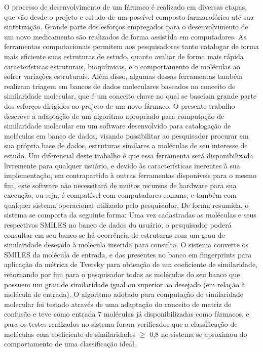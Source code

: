 \begin{resumo}
O processo de desenvolvimento de um fármaco é realizado em diversas etapas, que vão desde
o projeto e estudo de um possível composto farmacofórico até sua sintetização. Grande parte
dos esforços empregados para o desenvolvimento de um novo medicamento são realizados de
forma assistida em computadores. As ferramentas computacionais permitem aos pesquisadores
tanto catalogar de forma mais eficiente suas estruturas de estudo, quanto avaliar de forma mais rápida características estruturais, bioquímicas, e o comportamento de moléculas ao sofrer variações estruturais. Além disso, algumas dessas ferramentas também realizam triagem em bancos de dados moleculares baseados no conceito de similaridade molecular, que é um conceito chave no qual se baseiam grande parte dos esforços dirigidos ao projeto de um novo fármaco. O presente trabalho descreve a adaptação de um algoritmo apropriado para
computação de similaridade molecular em um software desenvolvido para catalogação de
moléculas em banco de dados, visando possibilitar ao pesquisador procurar em sua própria
base de dados, estruturas similares a moléculas de seu interesse de estudo. Um diferencial deste trabalho é que essa ferramenta será disponibilizada livremente para qualquer usuário, e devido às características inerentes à sua implementação, em contrapartida à outras ferramentas
disponíveis para o mesmo fim, este software não necessitará de muitos recursos de hardware
para sua execução, ou seja, é compatível com computadores comuns, e também com qualquer
sistema operacional utilizado pelo pesquisador. De forma resumida, o sistema se comporta da
seguinte forma: Uma vez cadastradas as moléculas e seus respectivos SMILES no banco de dados do usuário, o
pesquisador poderá consultar em seu banco se há ocorrência de estruturas com um grau de
similaridade desejado à molécula inserida para consulta. O sistema converte os SMILES da molécula de
entrada, e das presentes no banco em fingerprints para aplicação da métrica de Tversky para
obtenção de um coeficiente de similaridade, retornando por fim para o pesquisador todas as
moléculas do seu banco que possuem um grau de similaridade igual ou superior ao desejado
(em relação à molécula de entrada). O algoritmo adotado para computação de similaridade molecular foi testado através de uma adaptação do conceito de matriz de confusão e teve como entrada 7 moléculas já disponibilizadas como fármacos, e para os testes realizados no sistema foram verificados que a classificação de moléculas com coeficiente de similaridades $\geq$ 0,8 no sistema se aproximou do comportamento de uma classificação ideal.
\end{resumo}	
